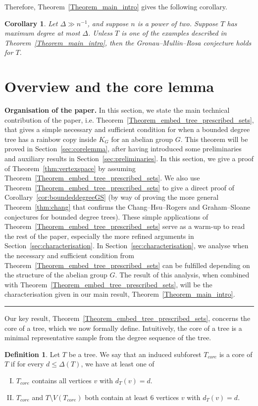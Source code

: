 \documentclass[a4paper,11pt,hidelinks]{amsart}
\newtheorem{corollary}[theorem]{Corollary}
\theoremstyle{definition}
\newtheorem{definition}[theorem]{Definition}
\begin{document}
Therefore, Theorem~\ref{Theorem_main_intro} gives the following corollary.
\begin{corollary}\label{cor:gronau} Let $\Delta\gg n^{-1}$, and suppose $n$ is a power of two. Suppose $T$ has maximum degree at most $\Delta$. Unless $T$ is one of the examples described in Theorem~\ref{Theorem_main_intro}, then the Gronau--Mullin--Rosa conjecture holds for $T$.
\end{corollary}
\section{Overview and the core lemma}
\textbf{Organisation of the paper.} In this section, we state the main technical contribution of the paper, i.e. Theorem~\ref{Theorem_embed_tree_prescribed_sets}, that gives a simple necessary and sufficient condition for when a bounded degree tree has a rainbow copy inside $K_G$ for an abelian group $G$. This theorem will be proved in Section~\ref{sec:corelemma}, after having introduced some preliminaries and auxiliary results in Section~\ref{sec:preliminaries}. In this section, we give a proof of Theorem~\ref{thm:vertexspace} by assuming Theorem~\ref{Theorem_embed_tree_prescribed_sets}. We also use Theorem~\ref{Theorem_embed_tree_prescribed_sets} to give a direct proof of Corollary~\ref{cor:boundeddegreeGS} (by way of proving the more general Theorem~\ref{thm:chang} that confirms the Chang--Hsu--Rogers and Graham--Sloane conjectures for bounded degree trees). These simple applications of Theorem~\ref{Theorem_embed_tree_prescribed_sets} serve as a warm-up to read the rest of the paper, especially the more refined arguments in Section~\ref{sec:characterisation}. In Section~\ref{sec:characterisation}, we analyse when the necessary and sufficient condition from Theorem~\ref{Theorem_embed_tree_prescribed_sets} can be fulfilled depending on the structure of the abelian group $G$. The result of this analysis, when combined with Theorem~\ref{Theorem_embed_tree_prescribed_sets}, will be the characterisation given in our main result, Theorem~\ref{Theorem_main_intro}.
\begin{center}
\rule{5cm}{0.4pt}
\end{center}
\par Our key result, Theorem~\ref{Theorem_embed_tree_prescribed_sets}, concerns the core of a tree, which we now formally define. Intuitively, the core of a tree is a minimal representative sample from the degree sequence of the tree.
\begin{definition}
Let $T$ be a tree.
We say that an induced subforest  $T_{core}$ is a core of $T$ if for  every $d\leq \Delta(T)$, we have at least one of
\begin{enumerate}[(I)]
\item $T_{core}$ contains all vertices $v$ with  $d_T(v)=d$. 
\item $T_{core}$ and $T\setminus V(T_{core})$  both contain at least 6 vertices $v$ with $d_T(v)=d$.
\end{enumerate} 
\end{definition}
\end{document}
